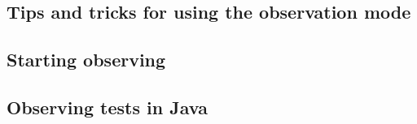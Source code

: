 % 
%
%

\subsection{Tips and tricks for using the observation mode}
\label{TasksObsModeTips}


\subsection{Starting observing}


\subsection{Observing tests in Java \gdauts{}}










%
